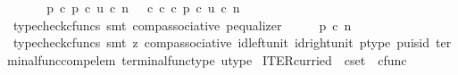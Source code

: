 \begin{isabellebody}
\ \ \isamarkupfalse%
\isanewline
\isanewline
\ \ \isamarkupfalse%
\ {\isachardoublequoteopen}p\ {\isasymcirc}\isactrlsub c\ p{\isacharprime}{\kern0pt}\ {\isasymcirc}\isactrlsub c\ u\ {\isasymcirc}\isactrlsub c\ n\ {\isacharequal}{\kern0pt}\ {\isacharparenleft}{\kern0pt}{\isasymt}\ {\isasymcirc}\isactrlsub c\ {\isasymbeta}\isactrlbsub {\isasymnat}\isactrlsub c\isactrlesub {\isacharparenright}{\kern0pt}\ {\isasymcirc}\isactrlsub c\ p{\isacharprime}{\kern0pt}\ {\isasymcirc}\isactrlsub c\ u\ {\isasymcirc}\isactrlsub c\ n{\isachardoublequoteclose}\isanewline
\ \ \ \ \isamarkupfalse%
\ {\isacharparenleft}{\kern0pt}typecheck{\isacharunderscore}{\kern0pt}cfuncs{\isacharcomma}{\kern0pt}\ smt\ comp{\isacharunderscore}{\kern0pt}associative{}\ p{\isacharprime}{\kern0pt}{\isacharunderscore}{\kern0pt}equalizer{\isacharparenright}{\kern0pt}\isanewline
\ \ \isamarkupfalse%
\ \isamarkupfalse%
\ {\isachardoublequoteopen}p\ {\isasymcirc}\isactrlsub c\ n\ {\isacharequal}{\kern0pt}\ {\isasymt}{\isachardoublequoteclose}\isanewline
\ \ \ \ \isamarkupfalse%
\ {\isacharparenleft}{\kern0pt}typecheck{\isacharunderscore}{\kern0pt}cfuncs{\isacharcomma}{\kern0pt}\ smt\ {\isacharparenleft}{\kern0pt}z{}{\isacharparenright}{\kern0pt}\ comp{\isacharunderscore}{\kern0pt}associative{}\ id{\isacharunderscore}{\kern0pt}left{\isacharunderscore}{\kern0pt}unit{}\ id{\isacharunderscore}{\kern0pt}right{\isacharunderscore}{\kern0pt}unit{}\ p{\isacharprime}{\kern0pt}{\isacharunderscore}{\kern0pt}type\ p{\isacharprime}{\kern0pt}{\isacharunderscore}{\kern0pt}u{\isacharunderscore}{\kern0pt}is{\isacharunderscore}{\kern0pt}id\ terminal{\isacharunderscore}{\kern0pt}func{\isacharunderscore}{\kern0pt}comp{\isacharunderscore}{\kern0pt}elem\ terminal{\isacharunderscore}{\kern0pt}func{\isacharunderscore}{\kern0pt}type\ u{\isacharunderscore}{\kern0pt}type{\isacharparenright}{\kern0pt}\isanewline
{}\isamarkupfalse%
%
\endisatagproof
{\isafoldproof}%
%
\isadelimproof
%
\endisadelimproof
%
\isadelimdocument
%
\endisadelimdocument
%
\isatagdocument
%
\isamarkuptrue%
%
\endisatagdocument
{\isafolddocument}%
%
\isadelimdocument
%
\endisadelimdocument
{}\isamarkupfalse%
\ ITER{\isacharunderscore}{\kern0pt}curried\ {\isacharcolon}{\kern0pt}{\isacharcolon}{\kern0pt}\ {\isachardoublequoteopen}cset\ {\isasymRightarrow}\ cfunc{\isachardoublequoteclose}\ \ \isanewline

\end{isabellebody}
